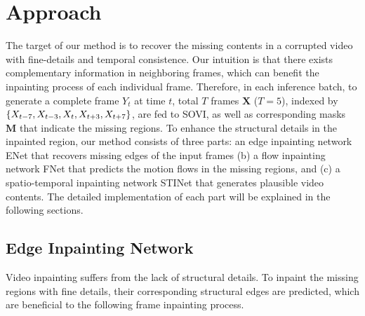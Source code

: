 \section{Approach}
\label{sec:approach}

The target of our method is to recover the missing contents in a corrupted video with fine-details and temporal consistence.
%
Our intuition is that there exists complementary information in neighboring frames, which can benefit the inpainting process of each individual frame.
Therefore, in each inference batch, to generate a complete frame \(Y_t\) at time $t$, total $T$ frames $\boldsymbol{X}$ ($T=5$), indexed by $\{X_{t-7},X_{t-3},X_{t},X_{t+3},X_{t+7}\}$, are fed to SOVI, as well as corresponding masks $\boldsymbol{M}$ that indicate the missing regions.
%
To enhance the structural details in the inpainted region, our method consists of three parts: an edge inpainting network ENet that recovers missing edges of the input frames (b) a flow inpainting network FNet that predicts the motion flows in the missing regions, and (c) a spatio-temporal inpainting network STINet that generates plausible video contents.%
The detailed implementation of each part will be explained in the following sections.
 



\subsection{Edge Inpainting Network}
\label{sec:edgenet}

Video inpainting suffers from the lack of structural details.
To inpaint the missing regions with fine details, their corresponding structural edges are predicted, which are beneficial to the following frame inpainting process.%
%

